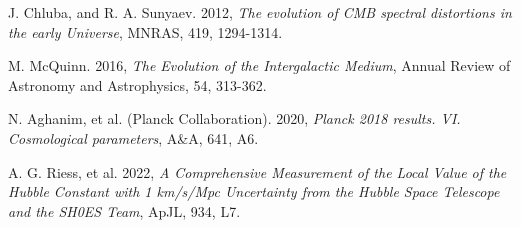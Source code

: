 \documentclass{BSpacePaper} %
\begin{document}

\begin{thebibliography}{9}
J. Chluba, and R. A. Sunyaev. 2012,
\textit{The evolution of CMB spectral distortions in the early Universe},
MNRAS, 419, 1294-1314.

M. McQuinn. 2016,
\textit{The Evolution of the Intergalactic Medium},
Annual Review of Astronomy and Astrophysics, 54, 313-362.

N. Aghanim, et al. (Planck Collaboration). 2020,
\textit{Planck 2018 results. VI. Cosmological parameters},
A\&A, 641, A6.

A. G. Riess, et al. 2022,
\textit{A Comprehensive Measurement of the Local Value of the Hubble Constant with 1 km/s/Mpc Uncertainty from the Hubble Space Telescope and the SH0ES Team},
ApJL, 934, L7.

\end{thebibliography}
\end{document}

